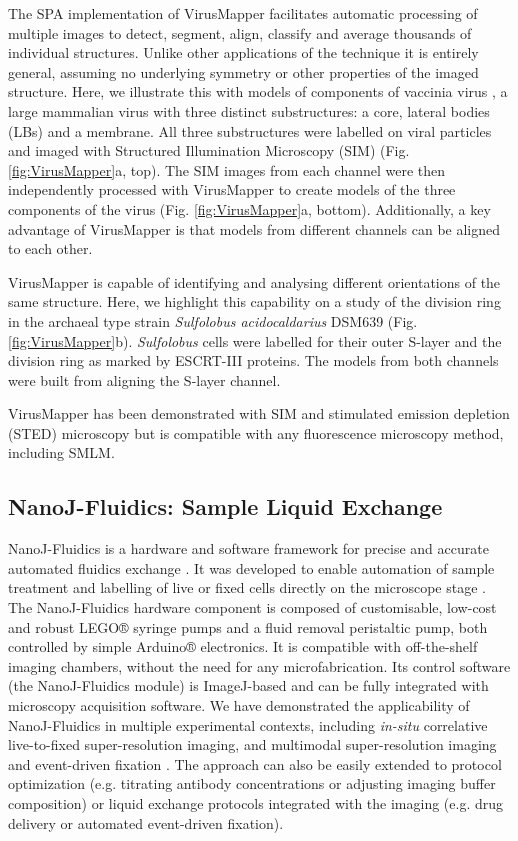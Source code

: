  The SPA implementation of VirusMapper facilitates automatic processing of multiple images to detect, segment, align, classify and average thousands of individual structures. Unlike other applications of the technique it is entirely general, assuming no underlying symmetry or other properties of the imaged structure. Here, we illustrate this with models of components of vaccinia virus \cite{FieldsVirology2013}, a large mammalian virus with three distinct substructures: a core, lateral bodies (LBs) and a membrane. All three substructures were labelled on viral particles and imaged with Structured Illumination Microscopy (SIM) \cite{gustafsson2000surpassing} (Fig. \ref{fig:VirusMapper}a, top). The SIM images from each channel were then independently processed with VirusMapper to create models of the three components of the virus (Fig. \ref{fig:VirusMapper}a, bottom). Additionally, a key advantage of VirusMapper is that models from different channels can be aligned to each other.

 VirusMapper is capable of identifying and analysing different orientations of the same structure. Here, we highlight this capability on a study of the division ring in the archaeal type strain \emph{Sulfolobus acidocaldarius} DSM639 (Fig. \ref{fig:VirusMapper}b). \emph{Sulfolobus} cells were labelled for their outer S-layer and the division ring as marked by ESCRT-III proteins. The models from both channels were built from aligning the S-layer channel.

 VirusMapper has been demonstrated with SIM and stimulated emission depletion (STED) microscopy \cite{gray2016virusmapper} but is compatible with any fluorescence microscopy method, including SMLM.

\subsection*{NanoJ-Fluidics: Sample Liquid Exchange}

 NanoJ-Fluidics is a hardware and software framework for precise and accurate automated fluidics exchange \cite{almada2018automating}. It was developed to enable automation of sample treatment and labelling of live or fixed cells directly on the microscope stage \cite{dix2018role}. The NanoJ-Fluidics hardware component is composed of customisable, low-cost and robust LEGO® syringe pumps and a fluid removal peristaltic pump, both controlled by simple Arduino® electronics. It is compatible with off-the-shelf imaging chambers, without the need for any microfabrication. Its control software (the NanoJ-Fluidics module) is ImageJ-based and can be fully integrated with microscopy acquisition software. We have demonstrated the applicability of NanoJ-Fluidics in multiple experimental contexts, including \textit{in-situ} correlative live-to-fixed super-resolution imaging, and multimodal super-resolution imaging and event-driven fixation \cite{almada2018automating}. The approach can also be easily extended to protocol optimization (e.g. titrating antibody concentrations or adjusting imaging buffer composition) or liquid exchange protocols integrated with the imaging (e.g. drug delivery or automated event-driven fixation).

